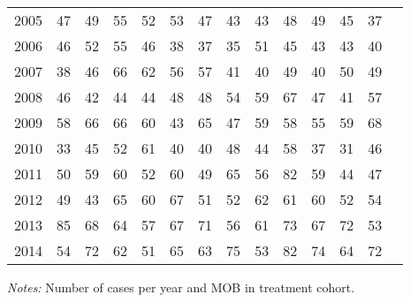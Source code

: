 \begin{table}[H]
\begin{threeparttable}
{\begin{tabular}{l*{13}{c}}
2005        &          47&          49&          55&          52&          53&          47&          43&          43&          48&          49&          45&          37\\
2006        &          46&          52&          55&          46&          38&          37&          35&          51&          45&          43&          43&          40\\
2007        &          38&          46&          66&          62&          56&          57&          41&          40&          49&          40&          50&          49\\
2008        &          46&          42&          44&          44&          48&          48&          54&          59&          67&          47&          41&          57\\
2009        &          58&          66&          66&          60&          43&          65&          47&          59&          58&          55&          59&          68\\
2010        &          33&          45&          52&          61&          40&          40&          48&          44&          58&          37&          31&          46\\
2011        &          50&          59&          60&          52&          60&          49&          65&          56&          82&          59&          44&          47\\
2012        &          49&          43&          65&          60&          67&          51&          52&          62&          61&          60&          52&          54\\
2013        &          85&          68&          64&          57&          67&          71&          56&          61&          73&          67&          72&          53\\
2014        &          54&          72&          62&          51&          65&          63&          75&          53&          82&          74&          64&          72\\
 \bottomrule \end{tabular} } \begin{tablenotes} \item \scriptsize \emph{Notes:} Number of cases per year and MOB in treatment cohort. \end{tablenotes} \end{threeparttable} \end{table} 
